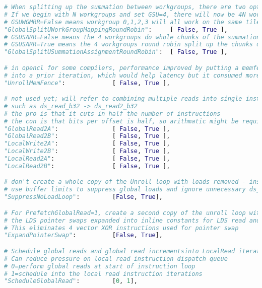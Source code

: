 \documentclass[]{article}
\begin{document}
\begin{lstlisting}[language=python,breaklines=true]
# When splitting up the summation between workgroups, there are two options for organizing which workgroup will do what
# If we begin with N workgroups and set GSU=4, there will now be 4N workgroups
# GSUWGMRR=False means workgroup 0,1,2,3 will all work on the same tile; =True means workgroup 0, N-1, 2N-1, 3N-1 will all work on the same tile
"GlobalSplitUWorkGroupMappingRoundRobin":     [ False, True ],
# GSUSARR=False means the 4 workgroups do whole chunks of the summation: k=0 -> K/4-1, k=K/4 -> 2K/4-1, k=2K/4 -> 3K/4-1, k=3K/4 -> 4K/4-1
# GSUSARR=True means the 4 workgroups round robin split up the chunks of the summation: k=0 -> DU-1, 4DU -> 5DU-1, ...; k=1DU -> 2DU-1, 5DU -> 6DU-1...; ...
"GlobalSplitUSummationAssignmentRoundRobin":  [ False, True ],

# in opencl for some compilers, performance improved by putting a memfence after each subiteration; it prevented the loads of one subiteration from being moved
# into a prior iteration, which would help latency but it consumed more vgprs which was a net loss
"UnrollMemFence":             [ False, True ],

# not used yet; will refer to combining multiple reads into single instruction
# such as ds_read_b32 -> ds_read2_b32
# the pro is that it cuts in half the number of instructions
# the con is that bits per offset is half, so arithmatic might be required to increment and reset offset vgprs
"GlobalRead2A":               [ False, True ],
"GlobalRead2B":               [ False, True ],
"LocalWrite2A":               [ False, True ],
"LocalWrite2B":               [ False, True ],
"LocalRead2A":                [ False, True ],
"LocalRead2B":                [ False, True ],

# don't create a whole copy of the Unroll loop with loads removed - instead
# use buffer limits to suppress global loads and ignore unnecessary ds_reads
"SuppressNoLoadLoop":         [False, True],

# For PrefetchGlobalRead=1, create a second copy of the unroll loop with
# the LDS pointer swaps expanded into inline constants for LDS read and write instructions
# This eliminates 4 vector XOR instructions used for pointer swap
"ExpandPointerSwap":          [False, True],

# Schedule global reads and global read incrementsinto LocalRead iterations
# Can reduce pressure on local read instruction dispatch queue
# 0=perform global reads at start of instruction loop
# 1=schedule into the local read instruction iterations
"ScheduleGlobalRead":         [0, 1],


\end{lstlisting}
\end{document}
